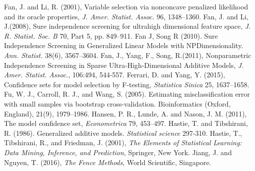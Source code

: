 \documentclass[12pt]{article} %
\theoremstyle{definition}
\begin{document}
\begin{thebibliography}{}
Fan, J. and Li, R. (2001), Variable selection via nonconcave penalized likelihood and its oracle properties, {\it J. Amer. Statist. Assoc.} 96, 1348--1360.
Fan, J. and Li, J.(2008), Sure independence screening for ultrahigh
dimensional feature space, {\it J. R. Statist. Soc. B} 70, Part 5, pp. 849–911.
Fan J, Song R (2010). Sure Independence Screening in Generalized Linear Models with NPDimensionality. {\it Ann. Statist.} 38(6), 3567–3604.
Fan, J., Yang, F., Song, R.(2011), Nonparametric Independence Screening in Sparse Ultra-High-Dimensional Additive Models, {\it J. Amer. Statist.
Assoc.}, 106:494, 544-557.
Ferrari, D. and Yang, Y. (2015), Confidence sets for model selection by F-testing,
{\it Statistica Sinica} 25, 1637--1658.
Fu, W. J., Carroll, R. J., and Wang, S. (2005). Estimating misclassification error with small samples via bootstrap cross-validation. Bioinformatics (Oxford, England), 21(9), 1979–1986.
Hansen, P. R., Lunde, A. and Nason, J. M. (2011), The model confidence set, {\it
Econometrica} 79, 453--497.
Hastie, T. and Tibshirani, R. (1986). Generalized additive models. {\it Statistical science} 297-310.
Hastie, T., Tibshirani, R., and Friedman, J. (2001), {\it The Elements of Statistical
Learning: Data Mining, Inference, and Prediction}, Springer, New York.
Jiang, J. and Nguyen, T. (2016), {\it The Fence Methods}, World Scientific, Singapore.


\end{thebibliography}
\end{document}
